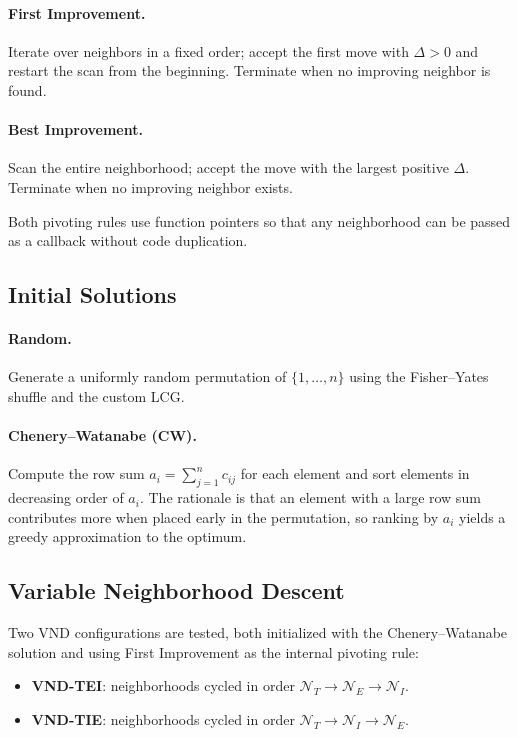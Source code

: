 \documentclass[11pt,a4paper]{article}
\begin{document}
\paragraph{First Improvement.}
Iterate over neighbors in a fixed order; accept the first move with
$\Delta > 0$ and restart the scan from the beginning.  Terminate when
no improving neighbor is found.

\paragraph{Best Improvement.}
Scan the entire neighborhood; accept the move with the largest positive
$\Delta$.  Terminate when no improving neighbor exists.

Both pivoting rules use function pointers so that any neighborhood can
be passed as a callback without code duplication.

\subsection{Initial Solutions}

\paragraph{Random.}
Generate a uniformly random permutation of $\{1,\ldots,n\}$ using the
Fisher--Yates shuffle and the custom LCG.

\paragraph{Chenery--Watanabe (CW).}
Compute the row sum $a_i = \sum_{j=1}^n c_{ij}$ for each element and
sort elements in decreasing order of $a_i$.  The rationale is that an
element with a large row sum contributes more when placed early in the
permutation, so ranking by $a_i$ yields a greedy approximation to the
optimum.

\subsection{Variable Neighborhood Descent}

Two VND configurations are tested, both initialized with the
Chenery--Watanabe solution and using First Improvement as the internal
pivoting rule:

\begin{itemize}
  \item \textbf{VND-TEI}: neighborhoods cycled in order
        $\mathcal{N}_T \to \mathcal{N}_E \to \mathcal{N}_I$.
  \item \textbf{VND-TIE}: neighborhoods cycled in order
        $\mathcal{N}_T \to \mathcal{N}_I \to \mathcal{N}_E$.
\end{itemize}
\end{document}
